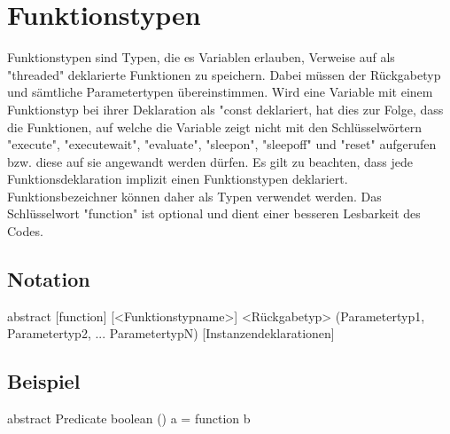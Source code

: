 \chapter{Funktionstypen}
Funktionstypen sind Typen, die es Variablen erlauben, Verweise auf als "threaded" deklarierte Funktionen zu speichern.
Dabei müssen der Rückgabetyp und sämtliche Parametertypen übereinstimmen.
Wird eine Variable mit einem Funktionstyp bei ihrer Deklaration als "const deklariert, hat dies zur Folge, dass die Funktionen,
auf welche die Variable zeigt nicht mit den Schlüsselwörtern "execute", "executewait", "evaluate", "sleepon", "sleepoff" und "reset" aufgerufen
bzw. diese auf sie angewandt werden dürfen.
Es gilt zu beachten, dass jede Funktionsdeklaration implizit einen Funktionstypen deklariert. Funktionsbezeichner können daher als Typen
verwendet werden.
Das Schlüsselwort "function" ist optional und dient einer besseren Lesbarkeit des Codes.

\section{Notation}
abstract [function] [<Funktionstypname>] <Rückgabetyp> (Parametertyp1, Parametertyp2, ... ParametertypN) [Instanzendeklarationen]

\section{Beispiel}
abstract Predicate boolean () a = function b